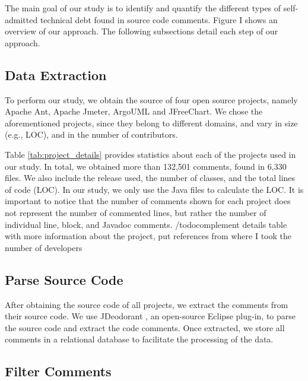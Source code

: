
The main goal of our study is to identify and quantify the different types of self-admitted technical debt found in source code comments. Figure I shows an overview of our approach. The following subsections detail each step of our approach.

\subsection{Data Extraction} %
\label{sub:data_extraction}

To perform our study, we obtain the source of four open source projects, namely Apache Ant, Apache Jmeter, ArgoUML and JFreeChart. We chose the aforementioned projects, since they belong to different domains, and vary in size (e.g., LOC), and in the number of contributors.

Table \ref{tab:project_details} provides statistics about each of the projects used in our study. In total, we obtained more than 132,501 comments, found in 6,330 files. We also include the release used, the number of classes, and the total lines of code (LOC). In our study, we only use the Java files to calculate the LOC. It is important to notice that the number of comments shown for each project does not represent the number of commented lines, but rather the number of individual line, block, and Javadoc comments.
/todo{complement details table with more information about the project, put references from where I took the number of developers}
 
\subsection{Parse Source Code} %
\label{sub:parse_source_code}
After obtaining the source code of all projects, we extract the comments from their source code. We use JDeodorant \cite{Tsantalis2008CSMR}, an open-source Eclipse plug-in, to parse the source code and extract the code comments. Once extracted, we store all comments in a relational database to facilitate the processing of the data.

\subsection{Filter Comments} %
\label{sub:filter_comments}

